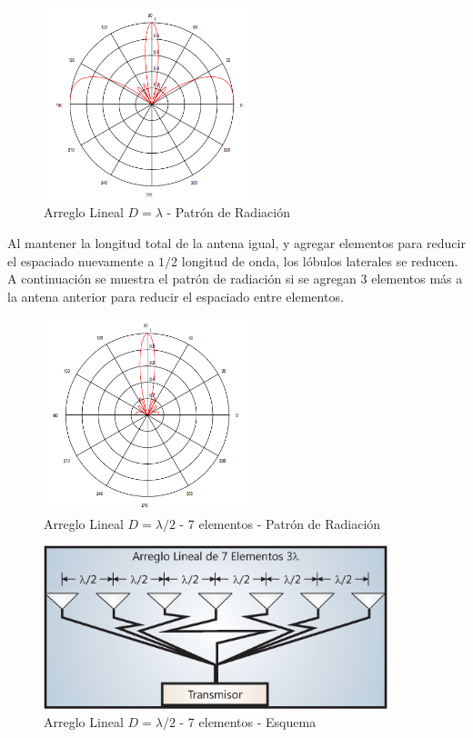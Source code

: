 \begin{figure}[htb!]
        \centering
        \includegraphics[width=6cm]{./figures/C02-linear_array_2}
        \caption{Arreglo Lineal $D=\lambda$ - Patrón de Radiación}
        \label{fig:linear_array_2}
\end{figure}

Al mantener la longitud total de la antena igual, y agregar elementos para reducir el espaciado nuevamente a $1/2$ longitud de onda, los lóbulos laterales se reducen. A continuación se muestra el patrón de radiación si se agregan 3 elementos más a la antena anterior para reducir el espaciado entre elementos.

\begin{figure}[htb!]
        \centering
        \includegraphics[width=6cm]{./figures/C02-linear_array_3}
        \caption{Arreglo Lineal $D=\lambda/2$ - 7 elementos - Patrón de Radiación}
        \label{fig:linear_array_3}
\end{figure}

\begin{figure}[htb!]
        \centering
        \includegraphics[width=10cm]{./figures/C02-linear_array_4}
        \caption{Arreglo Lineal $D=\lambda/2$ - 7 elementos - Esquema}
        \label{fig:linear_array_4}
\end{figure}

